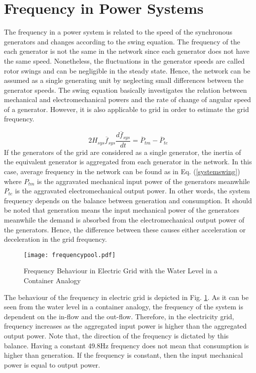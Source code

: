 \section{Frequency in Power Systems}
The frequency in a power system is related to the speed of the synchronous generators and changes according to the swing equation. The frequency of the each generator is not the same in the network since each generator does not have the same speed. Nonetheless, the fluctuations in the generator speeds are called rotor swings and can be negligible in the steady state. Hence, the network can be assumed as a single generating unit by neglecting small differences between the generator speeds. The swing equation basically investigates the relation between mechanical and electromechanical powers and the rate of change of angular speed of a generator. However, it is also applicable to grid in order to estimate the grid frequency.\par
\begin{equation}
\label{systemswing}
2H_{sys}\overline{f}_{sys}\frac{d\overline{f}_{sys}}{dt}=\overline{P}_{tm}-\overline{P}_{te}
\end{equation}
If the generators of the grid are considered as a single generator, the inertia of the equivalent generator is aggregated from each generator in the network. In this case, average frequency in the network can be found as in Eq. (\ref{systemswing}) where $P_{tm}$ is the aggravated mechanical input power of the generators meanwhile $P_{te}$ is the aggravated electromechanical output power. In other words, the system frequency depends on the balance between generation and consumption. It should be noted that generation means the input mechanical power of the generators meanwhile the demand is absorbed from the electromechanical output power of the generators. Hence, the difference between these causes either acceleration or deceleration in the grid frequency. \par
\begin{figure}[h!]
	\centering
	\texttt{[image: frequencypool.pdf]}
	\caption{Frequency Behaviour in Electric Grid with the Water Level in a Container Analogy \cite{Eto2010}}
	\label{frequencyingrid}
\end{figure}
The behaviour of the frequency in electric grid is depicted in Fig. \ref{frequencyingrid}. As it can be seen from the water level in a container analogy, the frequency of the system is dependent on the in-flow and the out-flow. Therefore, in the electricity grid, frequency increases as the aggregated input power is higher than the aggregated output power. Note that, the direction of the frequency is dictated by this balance. Having a constant 49.8Hz frequency does not mean that consumption is higher than generation. If the frequency is constant, then the input mechanical power is equal to output power.\par
